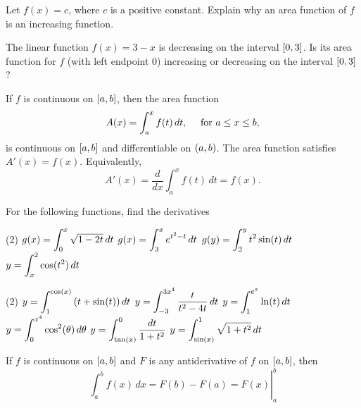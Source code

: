 \documentclass[mathNotesPreamble]{subfiles}
\begin{document}
\begin{ex*}
  Let $f(x)=c$, where $c$ is a positive constant. Explain why an area function of $f$ is an increasing function.
\end{ex*}

\begin{ex*}
  The linear function $f(x)=3-x$ is decreasing on the interval ${\left[0,3\right]}$. Is its area function for $f$ (with left endpoint 0) increasing or decreasing on the interval ${\left[0,3\right]}$?
\end{ex*}
\pagebreak

\begin{thmBox*}
  \hspace*{10pt} 
  \parbox{0.9\linewidth}{
  If $f$ is continuous on ${\left[a,b\right]}$, then the area function
    \[A(x)=\int_a^x f(t)\,dt,\quad \textnormal{ for } a\leq x\leq b,\]
  is continuous on ${\left[a,b\right]}$ and differentiable on ${\left(a,b\right)}$. The area function satisfies $A'(x)=f(x)$. Equivalently,
    \[A'(x)=\frac{d}{dx}\int_a^x f(t)\,dt=f(x).\]
  }
\end{thmBox*}

\begin{ex*}
  For the following functions, find the derivatives
\end{ex*}
\begin{tasks}[after-item-skip=\stretch{1}](2)
  \task $g(x)=\displaystyle\int_0^x \sqrt{1-2t}\,dt$
  \task $g(x)=\displaystyle\int_3^x e^{t^2-t}\,dt$
  \task $g(y)=\displaystyle\int_2^y t^2\sin(t)\,dt$
  \task $y=\displaystyle\int_x^2 \cos(t^2)\,dt$
\end{tasks}
\pagebreak

\begin{tasks}[after-item-skip=\stretch{1}, resume](2)
  \task $y=\displaystyle\int_1^{\cos(x)} {\left(t+\sin(t)\right)}\,dt$
  \task $y=\displaystyle\int_{-3}^{3x^4} \frac{t}{t^2-4t}\,dt$
  \task $y=\displaystyle\int_1^{e^x} \ln(t)\,dt$
  \task $y=\displaystyle\int_0^{x^4} \cos^2(\theta)\,d\theta$
  \task $y=\displaystyle\int_{\tan(x)}^0 \frac{dt}{1+t^2}$
  \task $y=\displaystyle\int_{\sin(x)}^1 \sqrt{1+t^2}\,dt$
\end{tasks}
\pagebreak

\begin{thmBox*}
  If $f$ is continuous on ${\left[a,b\right]}$ and $F$ is any antiderivative of $f$ on ${\left[a,b\right]}$, then
    \[\left.\int_a^b f(x)\,dx=F(b)-F(a)=F(x)\right|_a^b\]
\end{thmBox*}
\end{document}
